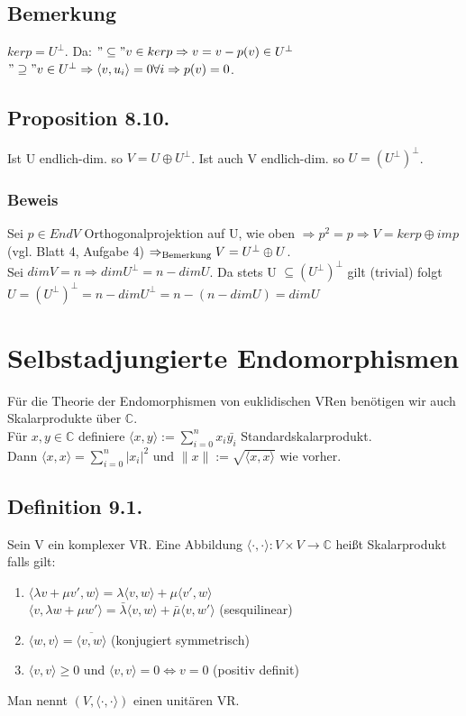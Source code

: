 \documentclass[a4paper, 12pt]{extarticle}
\newcommand{\norm}[1]{
	\parallel #1 \parallel
}
\newcommand{\skalar}[2] {
	\langle #1, #2\rangle
}
\newcommand{\genskalar}{
	\skalar{\cdot }{\cdot }
}
\newcommand{\gdw}{\Leftrightarrow}
\newcommand{\tn}[1]{\textnormal {#1}}
\begin{document}
\subsection*{Bemerkung}
$ker p = U^\perp$. Da: $"\subseteq" v\in kerp \Rightarrow v=v-p(v)\in U^\perp$ \\
$"\supseteq" v \in U^\perp \Rightarrow \skalar{v}{u_i} = 0\forall i \Rightarrow p(v)=0$.
\subsection*{Proposition 8.10.}
Ist U endlich-dim. so $V=U\oplus U^\perp$.
Ist auch V endlich-dim. so $U = (U^\perp)^\perp$.
\subsubsection{Beweis}
Sei $p\in EndV$ Orthogonalprojektion auf U, wie oben $\Rightarrow p^2=p \Rightarrow V=ker p \oplus im p$ (vgl. Blatt 4, Aufgabe 4) $\Rightarrow_{\tn{Bemerkung}} V = U^\perp \oplus U$. \\
Sei $dimV = n \Rightarrow dim U^\perp = n - dim U$.
Da stets U $\subseteq (U^\perp)^\perp$ gilt (trivial) folgt $U = (U^\perp)^\perp = n- dim U^\perp = n - (n- dimU) = dim U$ 
\section{Selbstadjungierte Endomorphismen}
Für die Theorie der Endomorphismen von euklidischen VRen benötigen wir auch Skalarprodukte über $\mathbb C$. \\
Für $x,y\in \mathbb C$ definiere $\skalar{x}{y}:= \sum_{i=0}^{n}x_i\bar{y_i}$ Standardskalarprodukt. \\
Dann $\skalar{x}{x} = \sum_{i=0}^{n}|x_i|^2$ und $\norm{x} := \sqrt{\skalar{x}{x}}$ wie vorher.
\subsection*{Definition 9.1.}
Sein V ein komplexer VR. Eine Abbildung $\genskalar:V\times V\to \mathbb C$ heißt Skalarprodukt falls gilt: \\
\begin{enumerate}[start=1,label={(\bfseries S\arabic*)':}]
	\item $\skalar{\lambda v+\mu v'}{w} = \lambda\skalar{v}{w} + \mu \skalar{v'}{w}$ \\
 	$\skalar{v}{\lambda w+\mu w'} = \bar\lambda\skalar{v}{w} + \bar\mu\skalar{v}{w'}$ (sesquilinear)
	\item $\skalar{w}{v}=\overline{\skalar{v}{w}}$ (konjugiert symmetrisch)
	\item $\skalar{v}{v} \geq 0$ und $\skalar{v}{v} = 0 \gdw v = 0$ (positiv definit)
\end{enumerate}
Man nennt $(V,\genskalar)$ einen unitären VR.
\end{document}
